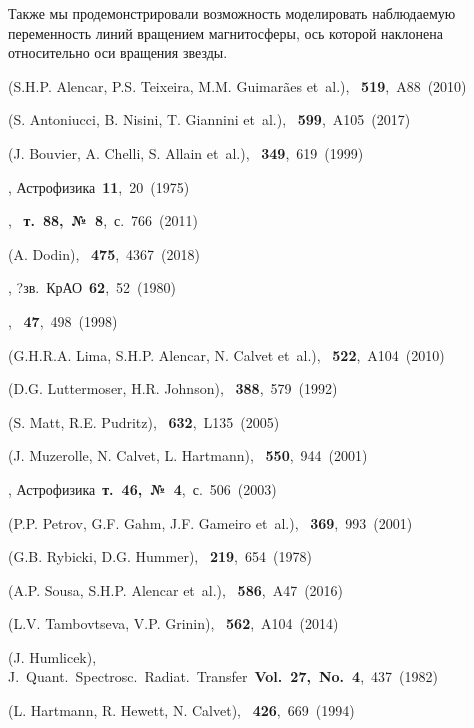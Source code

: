 \documentclass{article}
\def\etal{{et~al.}}
\def\etal{{et~al.}}
\begin{document}
Также мы продемонстрировали возможность моделировать наблюдаемую переменность линий вращением магнитосферы, ось которой наклонена относительно оси вращения звезды.

\begin{references}

 (S.H.P. Alencar, P.S. Teixeira, M.M. Guimarães \etal), \aap~{\bf 519},~A88~(2010)

 (S. Antoniucci, B. Nisini, T. Giannini \etal), \aap~{\bf 599},~A105~(2017)

 (J. Bouvier, A. Chelli, S. Allain \etal), \aap~{\bf 349},~619~(1999)

, Астрофизика~{\bf 11},~20~(1975)

, \azh~{\bf т.~88,~№~8},~с.~766~(2011)

 (A. Dodin), \mnras~{\bf 475},~4367~(2018)

, ?зв.~КрАО~{\bf 62},~52~(1980)

, \azh~{\bf 47},~498~(1998)

 (G.H.R.A. Lima, S.H.P. Alencar, N. Calvet \etal), \aap~{\bf 522},~A104~(2010)

 (D.G. Luttermoser, H.R. Johnson), \apj~{\bf 388},~579~(1992)

 (S. Matt, R.E. Pudritz), \apjl~{\bf 632},~L135~(2005)

 (J. Muzerolle, N. Calvet, L. Hartmann), \apj~{\bf 550},~944~(2001)

, Астрофизика~{\bf т.~46,~№~4},~с.~506~(2003)

 (P.P. Petrov, G.F. Gahm, J.F. Gameiro \etal), \aap~{\bf 369},~993~(2001)  

 (G.B. Rybicki, D.G. Hummer), \apj~{\bf 219},~654~(1978)

 (A.P. Sousa, S.H.P. Alencar \etal), \aap~{\bf 586},~A47~(2016) 

 (L.V. Tambovtseva, V.P. Grinin), \aap~{\bf 562},~A104~(2014)

 (J. Humlicek), J.~Quant.~Spectrosc.~Radiat.~Transfer~{\bf Vol.~27,~No.~4},~437~(1982)  

 (L. Hartmann, R. Hewett, N. Calvet), \apj~{\bf 426},~669~(1994)

\end{references}
\end{document}
